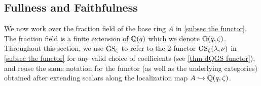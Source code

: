 
\subsection{Fullness and Faithfulness}\label{subsec fullness and faithfulness}
We now work over the fraction field of the base ring $A$ in \cref{subsec the functor}. The fraction field is a finite extension of $\mathbb{Q}(q)$ which we denote $\mathbb{Q}(q,\zeta)$.
Throughout this section, we use $\operatorname{GS}_\zeta$ to refer to the 2-functor $\operatorname{GS}_\zeta(\lambda, \nu)$ in \cref{subsec the functor} for any valid choice of coefficients (see \cref{thm dQGS functor}), and reuse the same notation for the functor (as well as the underlying categories) obtained after extending scalars along the localization map $A \hookrightarrow \mathbb{Q}(q,\zeta)$.


